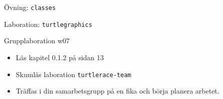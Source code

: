 

\ifkompendium\else

\begin{Slide}{Övning: \texttt{classes}}
\begin{itemize}\SlideFontSmall

\end{itemize}
\end{Slide}

\begin{Slide}{Laboration: \texttt{turtlegraphics}}
\begin{itemize}

\end{itemize}
\end{Slide}

\begin{Slide}{Grupplaboration w07}
\begin{itemize}
\item Läs kapitel 0.1.2 på sidan 13
\item Skumläs laboration \texttt{turtlerace-team}
\item Träffas i din samarbetsgrupp på en fika och börja planera arbetet.
\end{itemize}
\end{Slide}

\fi

